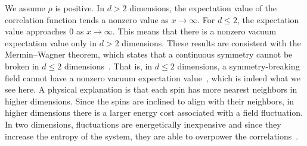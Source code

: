 {	We assume $\rho$ is positive.  In $d > 2$ dimensions, the expectation value of the correlation function tends a nonzero value as $x \to \infty$.  For $d \leq 2$, the expectation value approaches $0$ as $x \to \infty$.  This means that there is a nonzero vacuum expectation value only in $d > 2$ dimensions.  These results are consistent with the Mermin--Wagner theorem, which states that a continuous symmetry cannot be broken in $d \leq 2$ dimensions~\cite{CMW}.  That is, in $d \leq 2$ dimensions, a symmetry-breaking field cannot have a nonzero vacuum expectation value~\cite[p.~460]{Peskin}, which is indeed what we see here.  A physical explanation is that each spin has more nearest neighbors in higher dimensions.  Since the spins are inclined to align with their neighbors, in higher dimensions there is a larger energy cost associated with a field fluctuation.  In two dimensions, fluctuations are energetically inexpensive and since they increase the entropy of the system, they are able to overpower the correlations~\cite{CMW}.
}